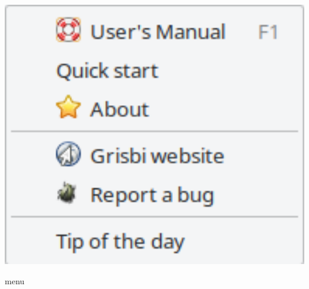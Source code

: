 \begin{minipage}{.3\linewidth}
	\centering						%
	\includegraphics[width=1\textwidth]{image/screenshot/home_menubar_help}
	\vspace{-15pt}					%
	\captionsetup{
		type=figure,%
		name=Fig.,%
		labelsep=newline}			%
	\caption{ menu}	%
	\label{home_menubar_help}
\end{minipage} 
\footnotetext{\urlGrisbi{}}	%
